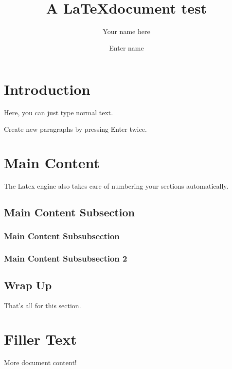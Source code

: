 \documentclass[11pt,letterpaper]{article}
\author{Your name here}
\date{Enter name}
\title{A \LaTeX document test}
\begin{document}
\maketitle

\newpage

\tableofcontents

\section{Introduction}
Here, you can just type normal text.

Create new paragraphs by pressing Enter twice.

\section{Main Content}
The Latex engine also takes care of numbering your sections automatically. 

    \subsection{Main Content Subsection}

        \subsubsection{Main Content Subsubsection}

        \subsubsection{Main Content Subsubsection 2}
        
    \subsection{Wrap Up}
    That's all for this section.


\section{Filler Text}
More document content!
\end{document}
